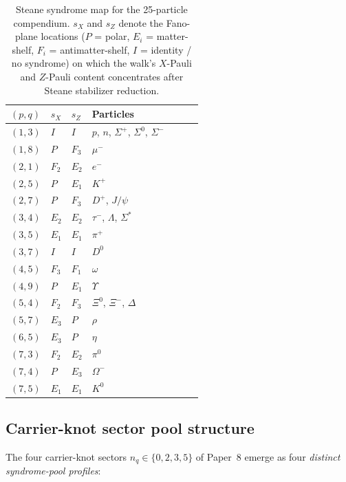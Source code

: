 \documentclass[11pt]{article}
\begin{document}
\begin{table}[h]
\centering
\caption{Steane syndrome map for the 25-particle compendium.  $s_X$ and $s_Z$ denote the Fano-plane locations ($P$ = polar, $E_i$ = matter-shelf, $F_i$ = antimatter-shelf, $I$ = identity / no syndrome) on which the walk's $X$-Pauli and $Z$-Pauli content concentrates after Steane stabilizer reduction.}
\label{tab:syndrome-fano-map}
\begin{tabular}{lllllll}
\toprule
$(p, q)$ & $s_X$ & $s_Z$ & Particles \\
\midrule
$(1, 3)$ & $I$    & $I$    & $p$, $n$, $\Sigma^+$, $\Sigma^0$, $\Sigma^-$ \\
$(1, 8)$ & $P$    & $F_3$  & $\mu^-$ \\
$(2, 1)$ & $F_2$  & $E_2$  & $e^-$ \\
$(2, 5)$ & $P$    & $E_1$  & $K^+$ \\
$(2, 7)$ & $P$    & $F_3$  & $D^+$, $J/\psi$ \\
$(3, 4)$ & $E_2$  & $E_2$  & $\tau^-$, $\Lambda$, $\Sigma^*$ \\
$(3, 5)$ & $E_1$  & $E_1$  & $\pi^+$ \\
$(3, 7)$ & $I$    & $I$    & $D^0$ \\
$(4, 5)$ & $F_3$  & $F_1$  & $\omega$ \\
$(4, 9)$ & $P$    & $E_1$  & $\Upsilon$ \\
$(5, 4)$ & $F_2$  & $F_3$  & $\Xi^0$, $\Xi^-$, $\Delta$ \\
$(5, 7)$ & $E_3$  & $P$    & $\rho$ \\
$(6, 5)$ & $E_3$  & $P$    & $\eta$ \\
$(7, 3)$ & $F_2$  & $E_2$  & $\pi^0$ \\
$(7, 4)$ & $P$    & $E_3$  & $\Omega^-$ \\
$(7, 5)$ & $E_1$  & $E_1$  & $K^0$ \\
\bottomrule
\end{tabular}
\end{table}

\subsection{Carrier-knot sector pool structure}
\label{sec:syndrome-pool-structure}

The four carrier-knot sectors $n_q \in \{0, 2, 3, 5\}$ of Paper~8 emerge as four \emph{distinct syndrome-pool profiles}:
\end{document}
